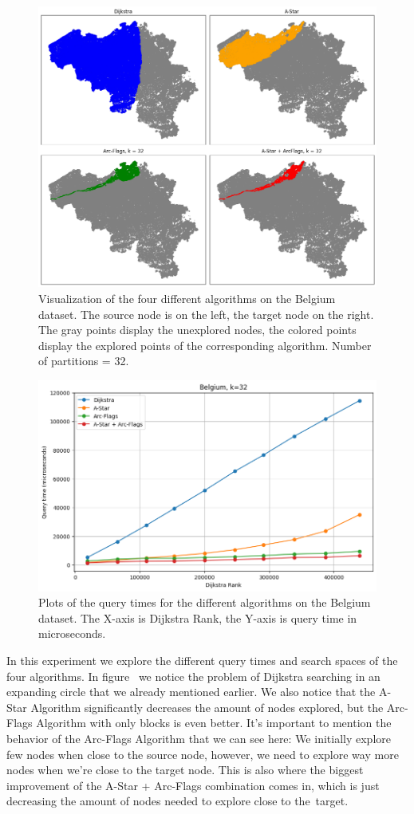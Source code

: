 \documentclass[acmsmall,nonacm,screen,review]{acmart}
\begin{document}
\begin{figure}[bt!]
    \centering
    \includegraphics[width=0.6\linewidth]{subplots.png}
    \caption{Visualization of the four different algorithms on the Belgium dataset. The source node is on the left, the target node on the right.
    The gray points display the unexplored nodes, the colored points display the explored points of the corresponding algorithm.
    Number of partitions = 32.}
    \label{fig1}
\end{figure}

\begin{figure}[bt!]
    \centering
    \includegraphics[width=0.6\linewidth]{belquery.png}
    \caption{Plots of the query times for the different algorithms on the Belgium dataset. The X-axis is Dijkstra Rank, the Y-axis is query time in microseconds.}
    \label{fig2}
\end{figure}

In this experiment we explore the different query times and search spaces of the four algorithms. 
In figure~ we notice the problem of Dijkstra searching in an expanding circle that we already mentioned earlier. We also notice that the A-Star Algorithm
significantly decreases the amount of nodes explored, but the Arc-Flags Algorithm with only  blocks is even better. It's important to mention the behavior
of the Arc-Flags Algorithm that we can see here: We initially explore few nodes when close to the source node, however, we need to explore way more nodes when
we're close to the target node. This is also where the biggest improvement of the A-Star + Arc-Flags combination comes in, which is just decreasing the
amount of nodes needed to explore close to the~target.
\end{document}
